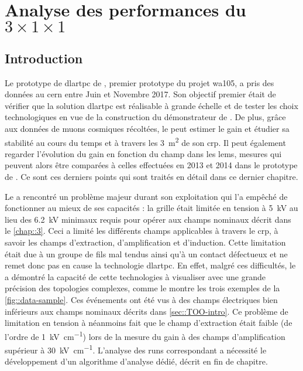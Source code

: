 \chapter{Analyse des performances du \texorpdfstring{$3\times 1\times 1$}{3x1x1}}\label{chap::5}
    
  \section{Introduction}
    Le prototype de \gls{dlartpc} de \TOO{}, premier prototype du projet \gls{wa105}, a pris des données au \gls{cern} entre Juin et Novembre 2017. Son objectif premier était de vérifier que la solution \gls{dlartpc} est réalisable à grande échelle et de tester les choix technologiques en vue de la construction du démonstrateur de \SSS{}. De plus, grâce aux données de muons cosmiques récoltées, le \TOO{} peut estimer le gain et étudier sa stabilité au cours du temps et à travers les \SI{3}{\meter\squared} de son \gls{crp}. Il peut également regarder l'évolution du gain en fonction du champ dans les \glspl{lem}, mesures qui peuvent alors être comparées à celles effectuées en 2013 et 2014 dans le prototype de \threeL{}\cite{Cantini2014}. Ce sont ces derniers points qui sont traités en détail dans ce dernier chapitre.

    Le \TOO{} a rencontré un problème majeur durant son exploitation qui l'a empêché de fonctionner au mieux de ses capacités : la grille était limitée en tension à \SI{5}{\kilo\volt} au lieu des \SI{6.2}{\kilo\volt} minimaux requis pour opérer aux champs nominaux décrit dans le \autoref{chap::3}. Ceci a limité les différents champs applicables à travers le \gls{crp}, à savoir les champs d'extraction, d'amplification et d'induction. Cette limitation était due à un groupe de fils mal tendus ainsi qu'à un contact défectueux et ne remet donc pas en cause la technologie \gls{dlartpc}. En effet, malgré ces difficultés, le \TOO{} a démontré la capacité de cette technologies à visualiser avec une grande précision des topologies complexes, comme le montre les trois exemples de la \autoref{fig::data-sample}. Ces événements ont été vus à des champs électriques bien inférieurs aux champs nominaux décrits dans \autoref{sec::TOO-intro}. Ce problème de limitation en tension à néanmoins fait que le champ d'extraction était faible (de l'ordre de \SI{1}{\kilo\volt\per\centi\meter}) lors de la mesure du gain à des champs d'amplification supérieur à \SI{30}{\kilo\volt\per\centi\meter}. L'analyse des runs correspondant a nécessité le développement d'un algorithme d'analyse dédié, décrit en fin de chapitre.


